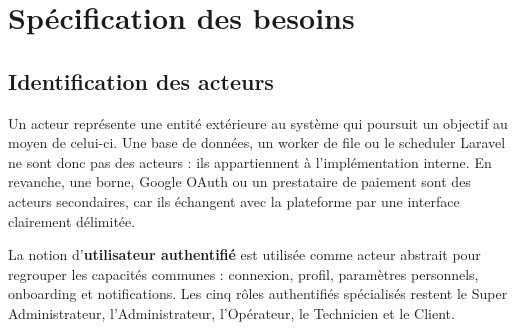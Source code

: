 \section{Spécification des besoins}

\subsection{Identification des acteurs}

Un acteur représente une entité extérieure au système qui poursuit un objectif au
moyen de celui-ci. Une base de données, un worker de file ou le scheduler Laravel ne
sont donc pas des acteurs : ils appartiennent à l'implémentation interne. En revanche,
une borne, Google OAuth ou un prestataire de paiement sont des acteurs secondaires,
car ils échangent avec la plateforme par une interface clairement délimitée.

La notion d'\textbf{utilisateur authentifié} est utilisée comme acteur abstrait pour
regrouper les capacités communes : connexion, profil, paramètres personnels,
onboarding et notifications. Les cinq rôles authentifiés spécialisés restent le
Super Administrateur, l'Administrateur, l'Opérateur, le Technicien et le Client.

